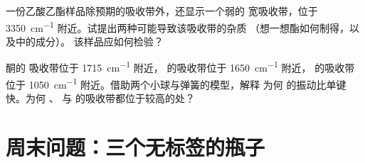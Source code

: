 \begin{exercise}[$\star\star\star$]\label{exo:g11:infrared:14}
一份乙酸乙酯样品除预期的吸收带外，还显示一个弱的
宽吸收带，位于 \qty{3350}{cm^{-1}} 附近。试提出两种可能导致该吸收带的杂质
（想一想酯如何制得，以及中的成分）。
该样品应如何检验？
\end{exercise}

\begin{exercise}[$\star\star\star$]\label{exo:g11:infrared:15}
酮的  吸收带位于 \qty{1715}{cm^{-1}} 附近，
 的吸收带位于 \qty{1650}{cm^{-1}} 附近， 的吸收带
位于 \qty{1050}{cm^{-1}} 附近。借助两个小球与弹簧的模型，解释
为何  的振动比单键  快。为何 、 与
 的吸收带都位于较高的处？
\end{exercise}

\section{周末问题：三个无标签的瓶子}

